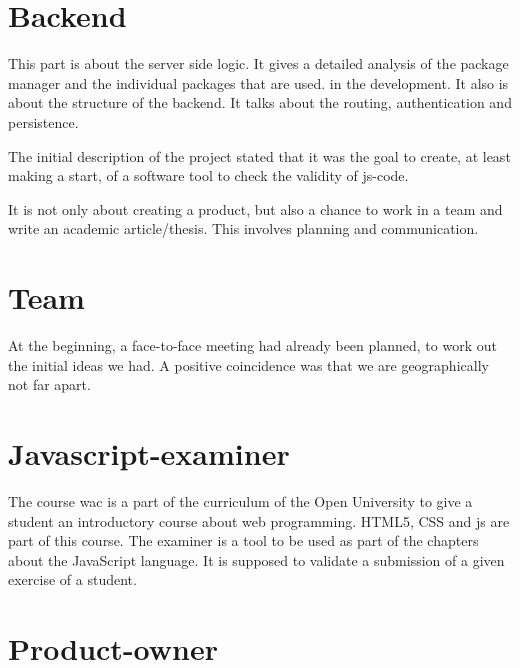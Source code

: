 \section{Backend}
This part is about the server side logic. It gives a detailed analysis of the
package manager and the individual packages that are used.
in the development. It also is about the structure of the backend.
It talks about the routing, authentication and persistence.

 



The initial description of the project stated that it was the goal to create,
at least making a start, of a software tool to check the validity
of \gls{js-code}.

It is not only about creating a product, but also a chance to work in a team and write an academic article/thesis.
This involves planning and communication.


\section{Team}
At the beginning, a face-to-face meeting had already been planned, to work out the initial ideas we had.
A positive coincidence was that we are geographically not far apart.


\section{Javascript-examiner}
The course \gls{wac} is a part of the curriculum of the Open University to give
a student an introductory course about web programming.
HTML5, CSS and \gls{js} are part of this course.
The \gls{examiner} is a tool to be used as part of the chapters about the JavaScript language.
It is supposed to validate a submission of a given exercise of a student.

\section{Product-owner}


